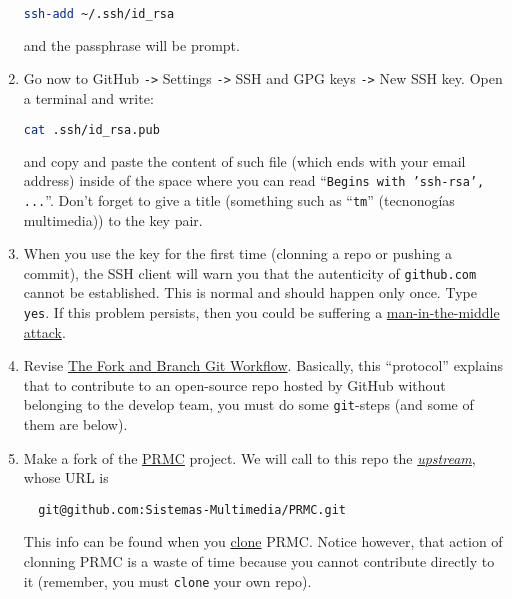\begin{enumerate}
  \begin{lstlisting}[language=bash]  
    ssh-add ~/.ssh/id_rsa
  \end{lstlisting}

  and the passphrase will be prompt.
  
\item Go now to GitHub \texttt{->} Settings \texttt{->} SSH and GPG
  keys \texttt{->} New SSH key. Open a terminal and write:
  
  \begin{lstlisting}[language=bash]  
    cat .ssh/id_rsa.pub
  \end{lstlisting}

  and copy and paste the content of such file (which ends with your
  email address) inside of the space where you can read
  ``\texttt{Begins with 'ssh-rsa', ...}''. Don't forget to give a
  title (something such as ``\texttt{tm}'' (tecnonogías multimedia))
  to the key pair.
  
\item When you use the key for the first time (clonning a repo or
  pushing a commit), the SSH client will warn you that the autenticity
  of \texttt{github.com} cannot be established. This is normal and
  should happen only once. Type \texttt{yes}. If this problem
  persists, then you could be suffering a
  \href{https://en.wikipedia.org/wiki/Man-in-the-middle_attack}{man-in-the-middle
    attack}.

\item Revise
  \href{https://github.com/vicente-gonzalez-ruiz/fork_and_branch_git_workflow}{The
    Fork and Branch Git Workflow}. Basically, this ``protocol''
  explains that to contribute to an open-source repo hosted by GitHub
  without belonging to the develop team, you must do some
  \texttt{git}-steps (and some of them are below).

\item Make a fork of the
  \href{https://github.com/Sistemas-Multimedia/PRMC}{PRMC}
  project. We will call to this repo the
  \href{https://docs.github.com/en/github/getting-started-with-github/github-glossary#upstream}{\emph{upstream}}, whose URL is
\begin{verbatim}
  git@github.com:Sistemas-Multimedia/PRMC.git
\end{verbatim}        
  This info can be found when you
  \href{https://docs.github.com/en/github/creating-cloning-and-archiving-repositories/cloning-a-repository}{clone}
  PRMC. Notice however, that action of clonning PRMC
  is a waste of time because you cannot contribute directly to it
  (remember, you must \texttt{clone} your own repo).


\end{enumerate}
